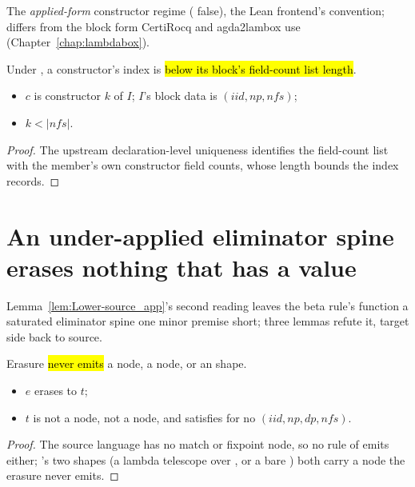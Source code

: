\begin{remark}
 The \emph{applied-form} constructor regime ( false),
the Lean frontend's convention; differs from the block form CertiRocq and agda2lambox use
(Chapter~\ref{chap:lambdabox}).
\end{remark}

\begin{lemma}
\label{lem:CtorOf-lt_nfs}
\leanok
{}
 Under , a constructor's index is \hl{below its block's
field-count list length}.
\begin{itemize}
\item {} $c$ is constructor $k$ of $I$; $I$'s block data is $(iid, np, nfs)$;
\item {} $k < |nfs|$.
\end{itemize}
\end{lemma}
\begin{proof}
\leanok
{}
 The upstream declaration-level uniqueness identifies the field-count list with the member's
own constructor field counts, whose length bounds the index  records.
\end{proof}

\section{An under-applied eliminator spine erases nothing that has a value}
\label{sec:correctness:elimspine}

Lemma~\ref{lem:Lower-source_app}'s second reading leaves the beta rule's function a saturated eliminator
spine one minor premise short; three lemmas refute it, target side back to source.

\begin{lemma}
\label{lem:erases_ne_case}
\leanok
{}
 Erasure \hl{never emits} a  node, a  node, or an 
shape.
\begin{itemize}
\item {} $e$ erases to $t$;
\item {} $t$ is not a  node, not a  node, and satisfies  for
no $(iid, np, dp, nfs)$.
\end{itemize}
\end{lemma}
\begin{proof}
\leanok
{}
 The source language has no match or fixpoint node, so no rule of \Erases{} emits either;
's two shapes (a lambda telescope over , or a bare ) both carry a
node the erasure never emits.
\end{proof}


